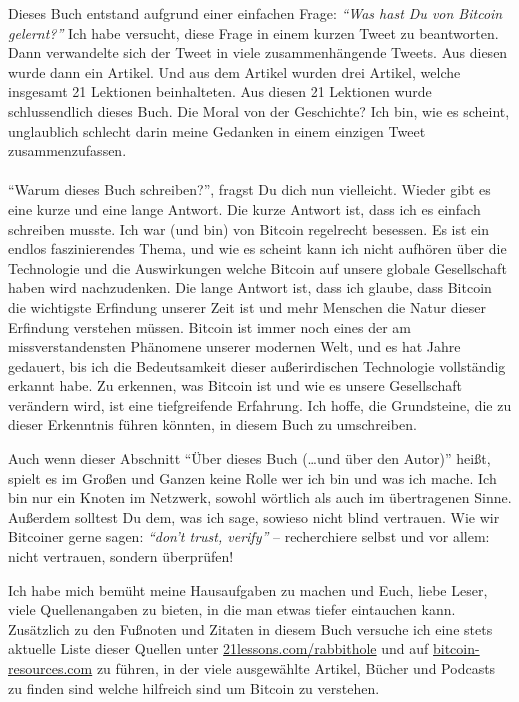 Dieses Buch entstand aufgrund einer einfachen Frage: \textit{\enquote{Was hast
Du von Bitcoin gelernt?}} Ich habe versucht, diese Frage in einem kurzen Tweet
zu beantworten. Dann verwandelte sich der Tweet in viele zusammenhängende
Tweets. Aus diesen wurde dann ein Artikel. Und aus dem Artikel wurden drei
Artikel, welche insgesamt 21 Lektionen beinhalteten. Aus diesen 21 Lektionen
wurde schlussendlich dieses Buch. Die Moral von der Geschichte? Ich bin, wie es
scheint,  unglaublich schlecht darin meine Gedanken in einem einzigen Tweet
zusammenzufassen.

\paragraph{}
\enquote{Warum dieses Buch schreiben?}, fragst Du dich nun vielleicht. Wieder
gibt es eine kurze und eine lange Antwort. Die kurze Antwort ist, dass ich es
einfach schreiben musste. Ich war (und bin) von Bitcoin regelrecht besessen. Es
ist ein endlos faszinierendes Thema, und wie es scheint kann ich nicht aufhören
über die Technologie und die Auswirkungen welche Bitcoin auf unsere globale
Gesellschaft haben wird nachzudenken. Die lange Antwort ist, dass ich glaube,
dass Bitcoin die wichtigste Erfindung unserer Zeit ist und mehr Menschen die
Natur dieser Erfindung verstehen müssen. Bitcoin ist immer noch eines der am
missverstandensten Phänomene unserer modernen Welt, und es hat Jahre
gedauert, bis ich die Bedeutsamkeit dieser außerirdischen Technologie vollständig
erkannt habe. Zu erkennen, was Bitcoin ist und wie es unsere Gesellschaft
verändern wird, ist eine tiefgreifende Erfahrung. Ich hoffe, die Grundsteine, die zu
dieser Erkenntnis führen könnten, in diesem Buch zu umschreiben.

Auch wenn dieser Abschnitt \enquote{Über dieses Buch (\ldots und über den
Autor)} heißt, spielt es im Großen und Ganzen keine Rolle wer ich bin und was
ich mache. Ich bin nur ein Knoten im Netzwerk, sowohl wörtlich als auch im
übertragenen Sinne. Außerdem solltest Du dem, was ich sage, sowieso nicht blind
vertrauen. Wie wir Bitcoiner gerne sagen: \textit{\enquote{don't trust, verify}}
-- recherchiere selbst und vor allem: nicht vertrauen, sondern überprüfen!

Ich habe mich bemüht meine Hausaufgaben zu machen und Euch, liebe Leser, viele
Quellenangaben zu bieten, in die man etwas tiefer eintauchen kann. Zusätzlich zu
den Fußnoten und Zitaten in diesem Buch versuche ich eine stets aktuelle Liste
dieser Quellen unter
\href{https://21lessons.com/rabbithole}{21lessons.com/rabbithole} und auf
\href{https://bitcoin-resources.com}{bitcoin-resources.com} zu führen, in der
viele ausgewählte Artikel, Bücher und Podcasts zu finden sind welche hilfreich
sind um Bitcoin zu verstehen.

